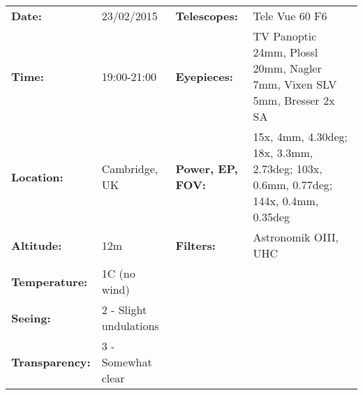 \begin{tabular}{ p{0.9in} p{1.3in} p{1.2in} p{5.2in}}
{\bf Date:} & 23/02/2015 & {\bf Telescopes:} & Tele Vue 60 F6 \\ 
{\bf Time:} & 19:00-21:00 & {\bf Eyepieces:} & TV Panoptic 24mm, Plossl 20mm, Nagler 7mm, Vixen SLV 5mm, Bresser 2x SA \\ 
{\bf Location:} & Cambridge, UK & {\bf Power, EP, FOV:} & 15x, 4mm, 4.30deg; 18x, 3.3mm, 2.73deg; 103x, 0.6mm, 0.77deg; 144x, 0.4mm, 0.35deg \\ 
{\bf Altitude:} & 12m & {\bf Filters:} & Astronomik OIII, UHC \\ 
{\bf Temperature:} & 1C (no wind) & & \\ 
{\bf Seeing:} & 2 - Slight undulations & & \\ 
{\bf Transparency:} & 3 - Somewhat clear & & \\ 
\end{tabular}
\centering 
